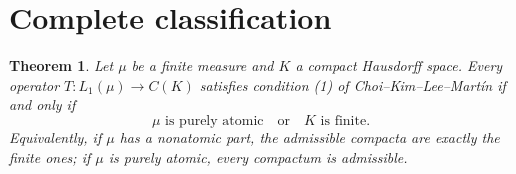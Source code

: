 \documentclass[11pt]{article}
\newtheorem{theorem}{Theorem}
\begin{document}
\section{Complete classification}

\begin{theorem}\label{thm:main}
Let $\mu$ be a finite measure and $K$ a compact Hausdorff space.  Every
operator $T:L_1(\mu)\to C(K)$ satisfies condition (1) of
Choi--Kim--Lee--Mart\'in if and only if
\begin{equation}\label{eq:classification}
 \mu\text{ is purely atomic}\quad\text{or}\quad K\text{ is finite}.
\end{equation}
Equivalently, if $\mu$ has a nonatomic part, the admissible compacta are
exactly the finite ones; if $\mu$ is purely atomic, every compactum is
admissible.
\end{theorem}
\end{document}
